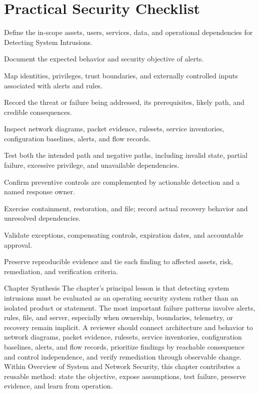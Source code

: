 \documentclass[11pt,letterpaper]{article}
\begin{document}
\section*{Practical Security Checklist}
\begin{CornellChecklist}
\item Define the in-scope assets, users, services, data, and operational dependencies for Detecting System Intrusions.
\item Document the expected behavior and security objective of alerts.
\item Map identities, privileges, trust boundaries, and externally controlled inputs associated with alerts and rules.
\item Record the threat or failure being addressed, its prerequisites, likely path, and credible consequences.
\item Inspect network diagrams, packet evidence, rulesets, service inventories, configuration baselines, alerts, and flow records.
\item Test both the intended path and negative paths, including invalid state, partial failure, excessive privilege, and unavailable dependencies.
\item Confirm preventive controls are complemented by actionable detection and a named response owner.
\item Exercise containment, restoration, and file; record actual recovery behavior and unresolved dependencies.
\item Validate exceptions, compensating controls, expiration dates, and accountable approval.
\item Preserve reproducible evidence and tie each finding to affected assets, risk, remediation, and verification criteria.
\end{CornellChecklist}
\begin{CornellSummaryBox}{Chapter Synthesis}
The chapter's principal lesson is that detecting system intrusions must be evaluated as an operating security system rather than an isolated product or statement. The most important failure patterns involve alerts, rules, file, and server, especially when ownership, boundaries, telemetry, or recovery remain implicit. A reviewer should connect architecture and behavior to network diagrams, packet evidence, rulesets, service inventories, configuration baselines, alerts, and flow records, prioritize findings by reachable consequence and control independence, and verify remediation through observable change. Within Overview of System and Network Security, this chapter contributes a reusable method: state the objective, expose assumptions, test failure, preserve evidence, and learn from operation.
\end{CornellSummaryBox}
\end{document}
